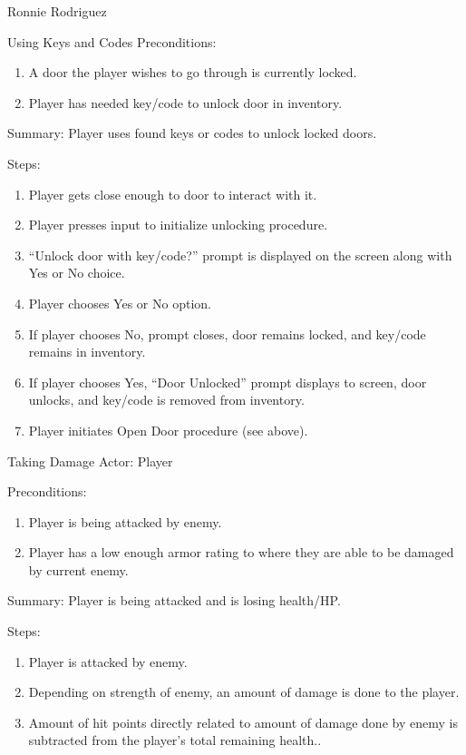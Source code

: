 \documentclass[12pt]{report}
\begin{document}
\begin{section}{Ronnie Rodriguez}
\begin{subsection}{Using Keys and Codes}
Preconditions:
\begin{enumerate}
\item A door the player wishes to go through is currently locked.
\item Player has needed key/code to unlock door in inventory.
\end{enumerate}

Summary: Player uses found keys or codes to unlock locked doors.

Steps:
\begin{enumerate}
\item Player gets close enough to door to interact with it.
\item Player presses input to initialize unlocking procedure.
\item ``Unlock door with key/code?'' prompt is displayed on the screen along
with Yes or No choice.
\item Player chooses Yes or No option.
\item If player chooses No, prompt closes, door remains locked, and key/code
remains in inventory.
\item If player chooses Yes, ``Door Unlocked'' prompt displays to screen,
door unlocks, and key/code is removed from inventory.
\item Player initiates Open Door procedure (see above).
\end{enumerate}
\end{subsection}

\begin{subsection}{Taking Damage}
Actor: Player

Preconditions:
\begin{enumerate}
\item Player is being attacked by enemy.
\item Player has a low enough armor rating to where they are able to be
damaged by current enemy.
\end{enumerate}

Summary: Player is being attacked and is losing health/HP.

Steps:
\begin{enumerate}
\item Player is attacked by enemy.
\item Depending on strength of enemy, an amount of damage is done to the
player.
\item Amount of hit points directly related to amount of damage done by
enemy is subtracted from the player's total remaining health..
\end{enumerate}
\end{subsection}


\end{section}
\end{document}
